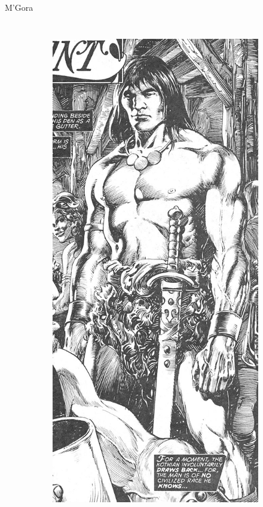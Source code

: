 \begin{frame}{M’Gora}
\begin{columns}
\begin{figure}[htp]
\begin{subfigure}[b]{0.23\textwidth}
				\includegraphics[width=\textwidth]{img/conan/TSSC}
			\end{subfigure}
		\end{figure}
	\end{columns}
\end{frame}
\note[itemize]{
	\item
}

